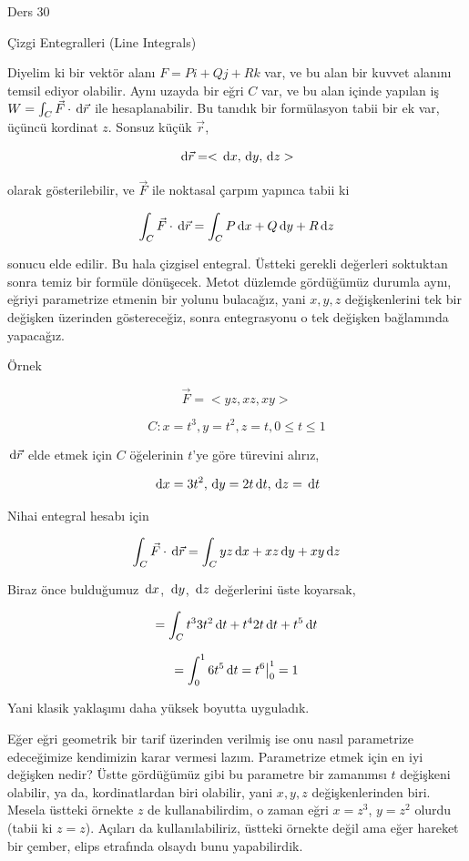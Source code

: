\documentclass[12pt,fleqn]{article}\usepackage{../../common}
\begin{document}
Ders 30

Çizgi Entegralleri (Line Integrals)

Diyelim ki bir vektör alanı $F = P i + Qj + Rk$ var, ve bu alan bir kuvvet
alanını temsil ediyor olabilir. Aynı uzayda bir eğri $C$ var, ve bu alan içinde
yapılan iş $W = \int_C \vec{F} \cdot \,\mathrm{d} \vec{r}$ ile hesaplanabilir. Bu tanıdık
bir formülasyon tabii bir ek var, üçüncü kordinat $z$. Sonsuz küçük $\vec{r}$,

$$
\,\mathrm{d}\vec{r} = < \,\mathrm{d} x, \,\mathrm{d} y, \,\mathrm{d} z >
$$

olarak gösterilebilir, ve $\vec{F}$ ile noktasal çarpım yapınca tabii ki

$$
\int_C \vec{F} \cdot \,\mathrm{d} \vec{r} =
\int_C P \,\mathrm{d} x + Q \,\mathrm{d} y + R \,\mathrm{d} z
$$

sonucu elde edilir. Bu hala çizgisel entegral. Üstteki gerekli değerleri
soktuktan sonra temiz bir formüle dönüşecek. Metot düzlemde gördüğümüz durumla
aynı, eğriyi parametrize etmenin bir yolunu bulacağız, yani $x,y,z$
değişkenlerini tek bir değişken üzerinden göstereceğiz, sonra entegrasyonu
o tek değişken bağlamında yapacağız.

Örnek

$$
\vec{F} = < yz, xz, xy >
$$

$$
C: x=t^3, y=t^2, z=t, 0 \le t \le 1
$$

$\,\mathrm{d}\vec{r}$ elde etmek için $C$ öğelerinin $t$'ye göre türevini alırız,

$$
\,\mathrm{d} x = 3t^2, \,\mathrm{d} y = 2t \,\mathrm{d} t, \,\mathrm{d} z = \,\mathrm{d} t
$$

Nihai entegral hesabı için 

$$
\int_C \vec{F} \cdot \,\mathrm{d} \vec{r} =
\int_C yz \,\mathrm{d} x + xz \,\mathrm{d} y + xy \,\mathrm{d} z
$$

Biraz önce bulduğumuz $\,\mathrm{d} x$, $\,\mathrm{d} y$, $\,\mathrm{d} z$ değerlerini üste koyarsak,

$$
= \int_C t^3 3t^2 \,\mathrm{d} t + t^4 2t \,\mathrm{d} t + t^5 \,\mathrm{d} t
$$

$$
= \int_{0}^{1} 6 t^5 \,\mathrm{d} t = t^6 \big\vert_{0}^{1} = 1
$$

Yani klasik yaklaşımı daha yüksek boyutta uyguladık.

Eğer eğri geometrik bir tarif üzerinden verilmiş ise onu nasıl parametrize
edeceğimize kendimizin karar vermesi lazım. Parametrize etmek için en iyi
değişken nedir? Üstte gördüğümüz gibi bu parametre bir zamanımsı $t$ değişkeni
olabilir, ya da, kordinatlardan biri olabilir, yani $x,y,z$ değişkenlerinden
biri. Mesela üstteki örnekte $z$ de kullanabilirdim, o zaman eğri $x=z^3$,
$y=z^2$ olurdu (tabii ki $z=z$). Açıları da kullanılabiliriz, üstteki örnekte
değil ama eğer hareket bir çember, elips etrafında olsaydı bunu yapabilirdik.
\end{document}
